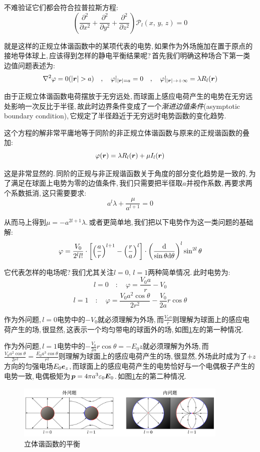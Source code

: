 不难验证它们都会符合拉普拉斯方程:
\[\left(\frac{\partial^2}{\partial x^2}+\frac{\partial^2}{\partial y^2}+\frac{\partial^2}{\partial z^2}\right)\mathcal{P}_l(x,\,y,\,z)=0\]

就是这样的正规立体谐函数中的某项代表的电势,\,如果作为外场施加在置于原点的接地导体球上,\,应该得到怎样的静电平衡结果呢?\,首先我们明确这种场合下第一类边值问题表述为:
\[\nabla^2\varphi=0(|\bs{r}|>a)\quad ,\quad \varphi|_{|\bs{r}|=a}=0 \quad ,\quad \varphi|_{|\bs{r}|\to+ \infty}=\lambda R_l(\bs{r})\]

由于正规立体谐函数电荷摆放于无穷远处,\,而球面上感应电荷产生的电势在无穷远处影响一次反比于半径,\,故此时边界条件变成了一个\emph{渐进边值条件}(asymptotic boundary condition),\,它规定了半径趋近于无穷远时电势函数的变化趋势.

这个方程的解非常平庸地等于同阶的非正规立体谐函数与原来的正规谐函数的叠加:
\[\varphi(\boldsymbol{r})=\lambda R_l(\boldsymbol{r})+\mu I_l(\boldsymbol{r})\]

这是非常显然的.\,同阶的正规与非正规谐函数关于角度的部分变化趋势是一致的,\,为了满足在球面上电势为零的边值条件,\,我们只需要把半径取$a$并视作系数,\,再要求两个系数抵消,\,这只需要要求:
\[a^l\lambda+\frac{\mu}{a^{l+1}}=0\]

从而马上得到$\mu=-a^{2l+1}\lambda$.\,或者更简单地,\,我们把以下电势作为这一类问题的基础解:
\[\varphi=\frac{V_0}{2^l l!}\cdot\left[\left(\frac{a}{r}\right)^{l+1}-\left(\frac{r}{a}\right)^l\right]\cdot\left(\frac{\textrm{d}}{\sin\theta\textrm{d} \theta}\right)^l\sin^{2l}\theta\]

它代表怎样的电场呢?\,我们尤其关注$l=0,\,l=1$两种简单情况.\,此时电势为:
\[l=0\quad:\quad\varphi=\frac{V_0 a}{r}-V_0\]
\[l=1\quad:\quad\varphi=\frac{V_0 a^2\cos\theta}{2r^2}-\frac{V_0}{2a}r\cos\theta\]

作为外问题,\,$l=0$电势中的$-V_0$就必须理解为外场,\,而$\frac{V_0 a}{r}$则理解为球面上的感应电荷产生的场,\,很显然,\,这表示一个均匀带电的球面外的场,\,如图\ref{fig:7-1-23}左的第一种情况.

作为外问题,\,$l=1$电势中的$-\frac{V_0}{2a}r\cos\theta=-E_0 z$就必须理解为外场,\,而$\frac{V_0 a^2\cos\theta}{2r^2}=\frac{E_0 a^3\cos\theta}{r^2}$则理解为球面上的感应电荷产生的场,\,很显然,\,外场此时成为了$+z$方向的匀强电场$E_0\boldsymbol{e}_z$,\,而球面上的感应电荷产生的电势恰好与一个电偶极子产生的电势一致,\,电偶极矩为$\boldsymbol{p}=4\pi a^3\varepsilon_0\boldsymbol{E}_0$.\,如图\ref{fig:7-1-23}左的第二种情况.

\begin{figure}[H]
\centering
\includegraphics[width=0.9\textwidth]{image/7-1-23.png}
\caption{立体谐函数的平衡}\label{fig:7-1-23}
\end{figure}



